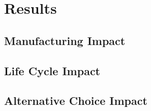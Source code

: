 \section{Results}\label{sec:results}

\subsection{Manufacturing Impact}\label{subsec:results_manufacturing}


\subsection{Life Cycle Impact}\label{subsec:results_life_cycle}


\subsection{Alternative Choice Impact}\label{subsec:results_green_alternative}